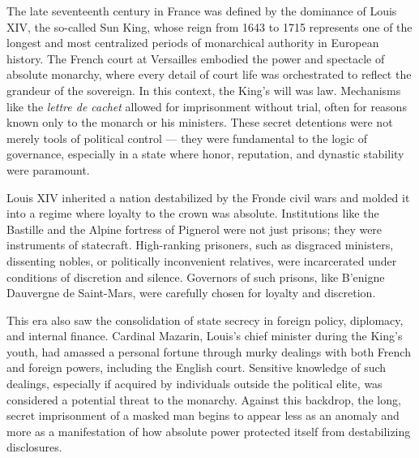 \begin{historical}
The late seventeenth century in France was defined by the dominance of Louis XIV, the so-called Sun King, whose reign from 1643 to 1715 represents one of the longest and most centralized periods of monarchical authority in European history. The French court at Versailles embodied the power and spectacle of absolute monarchy, where every detail of court life was orchestrated to reflect the grandeur of the sovereign. In this context, the King's will was law. Mechanisms like the \textit{lettre de cachet} allowed for imprisonment without trial, often for reasons known only to the monarch or his ministers. These secret detentions were not merely tools of political control — they were fundamental to the logic of governance, especially in a state where honor, reputation, and dynastic stability were paramount.

Louis XIV inherited a nation destabilized by the Fronde civil wars and molded it into a regime where loyalty to the crown was absolute. Institutions like the Bastille and the Alpine fortress of Pignerol were not just prisons; they were instruments of statecraft. High-ranking prisoners, such as disgraced ministers, dissenting nobles, or politically inconvenient relatives, were incarcerated under conditions of discretion and silence. Governors of such prisons, like B'enigne Dauvergne de Saint-Mars, were carefully chosen for loyalty and discretion.

This era also saw the consolidation of state secrecy in foreign policy, diplomacy, and internal finance. Cardinal Mazarin, Louis's chief minister during the King's youth, had amassed a personal fortune through murky dealings with both French and foreign powers, including the English court. Sensitive knowledge of such dealings, especially if acquired by individuals outside the political elite, was considered a potential threat to the monarchy. Against this backdrop, the long, secret imprisonment of a masked man begins to appear less as an anomaly and more as a manifestation of how absolute power protected itself from destabilizing disclosures.
\end{historical}